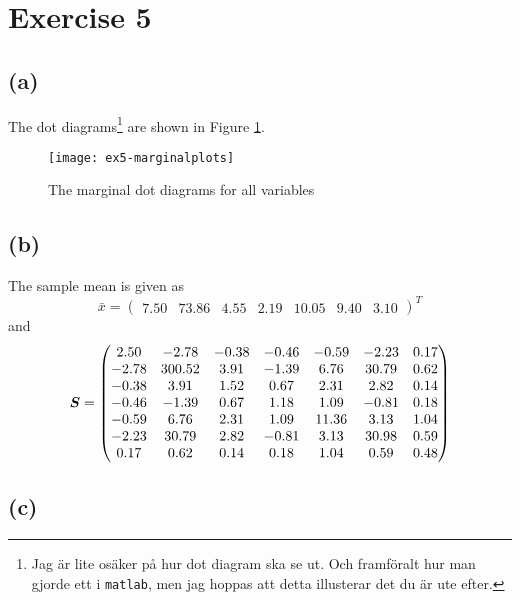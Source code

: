 
\section*{Exercise 5}
\label{sec:exercise5}

\subsection*{(a)}
\label{sec:a-4}

The dot diagrams\footnote{Jag är lite osäker på hur dot diagram ska se
  ut. Och framföralt hur man gjorde ett i \texttt{matlab}, men jag
  hoppas att detta illusterar det du är ute efter.} are shown in Figure \ref{fig:ex5-marginalplots}. 

\begin{figure}[h]
  \centering
  \texttt{[image: ex5-marginalplots]}
  \caption{The marginal dot diagrams for all variables}
  \label{fig:ex5-marginalplots}
\end{figure}

\subsection*{(b)}
\label{sec:b-4}

The sample mean is given as
\begin{equation*}
  \bar{x} =
  \begin{pmatrix}
    7.50 & 73.86 & 4.55 & 2.19 & 10.05 & 9.40 & 3.10 
  \end{pmatrix}^T
\end{equation*}
and
\begin{equation*}
  \bm{S} =
  \begin{pmatrix}
    2.50 & -2.78 & -0.38 & -0.46 & -0.59 & -2.23 & 0.17 \\ 
    -2.78 & 300.52 & 3.91 & -1.39 & 6.76 & 30.79 & 0.62 \\ 
    -0.38 & 3.91 & 1.52 & 0.67 & 2.31 & 2.82 & 0.14 \\ 
    -0.46 & -1.39 & 0.67 & 1.18 & 1.09 & -0.81 & 0.18 \\ 
    -0.59 & 6.76 & 2.31 & 1.09 & 11.36 & 3.13 & 1.04 \\ 
    -2.23 & 30.79 & 2.82 & -0.81 & 3.13 & 30.98 & 0.59 \\ 
    0.17 & 0.62 & 0.14 & 0.18 & 1.04 & 0.59 & 0.48 \\ 
  \end{pmatrix}
\end{equation*}

\subsection*{(c)}
\label{sec:c-4}

